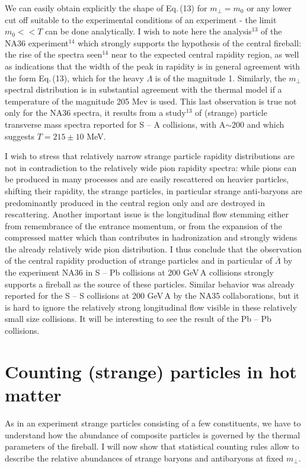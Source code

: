 \begin{mdframed}[linecolor=gray,roundcorner=12pt,backgroundcolor=Dandelion!15,linewidth=1pt,leftmargin=0cm,rightmargin=0cm,topline=true,bottomline=true,skipabove=12pt]
We can easily obtain explicitly the shape of Eq.\,(13) for
$m_\bot=m_0$ or any lower cut off suitable to the experimental conditions
of an experiment - the limit $m_0<<T$ can be done analytically. I wish to
note here the analysis$^{13}$ of the NA36 experiment$^{14}$ which
strongly supports the hypothesis of the central fireball: the rise of the
spectra seen$^{14}$ near to the expected central rapidity region, as well
as indications that the width of the peak in rapidity is in general
agreement with the form Eq.\,(13), which for the heavy $\Lambda$
is of the magnitude 1. Similarly, the $m_\bot$ spectral distribution is
in substantial agreement with the thermal model if a temperature of the
magnitude 205 Mev is used. This last observation is true not only for the
NA36 spectra, it results from a study$^{13}$ of (strange) particle
transverse mass spectra reported for S -- A collisions, with A$\sim 200$
and which suggests $T=215\pm10$ MeV.
 
I wish to stress that relatively narrow strange particle rapidity
distributions are not in contradiction to the relatively wide pion
rapidity spectra: while pions can be produced in many processes and are
easily rescattered on heavier particles, shifting their rapidity, the
strange particles, in particular strange anti-baryons are predominantly
produced in the central region only and are destroyed in rescattering.
Another important issue is the longitudinal flow stemming either from
remembrance of the entrance momentum, or from the expansion of the
compressed matter which than contributes in hadronization and strongly
widens the already relatively wide pion distribution. I thus conclude
that the observation of the central rapidity production of strange
particles and in particular of $\overline{\Lambda}$ by the experiment
NA36 in S -- Pb collisions at 200 GeV\,A collisions strongly supports a
fireball as the source of these particles. Similar behavior was already
reported for the S -- S collisions at 200 GeV\,A by the NA35 
collaborations, but it is hard to ignore the relatively strong 
longitudinal flow visible in these relatively small size collisions. It
will be interesting to see the result of the Pb -- Pb collisions.
 
\section*{Counting (strange) particles in hot matter}
As in an experiment strange particles consisting of a few constituents,
we have to understand how the abundance of composite particles is
governed by the thermal parameters of the fireball. I will now show that
statistical counting rules allow to describe the relative abundances of
strange baryons and antibaryons at fixed $m_\bot$.
 

\end{mdframed}
